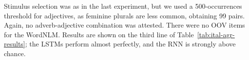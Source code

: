 Stimulus selection was as in the last experiment, but we used a 500-occurrences
threshold for adjectives, as feminine plurals are less common, obtaining 99 pairs. Again, no adverb-adjective combination was attested. %
There were no OOV items for the WordNLM. %
Results are shown on the third line of
Table~\ref{tab:ital-agr-results}; the LSTMs perform almost perfectly,
and the RNN is strongly above chance.

